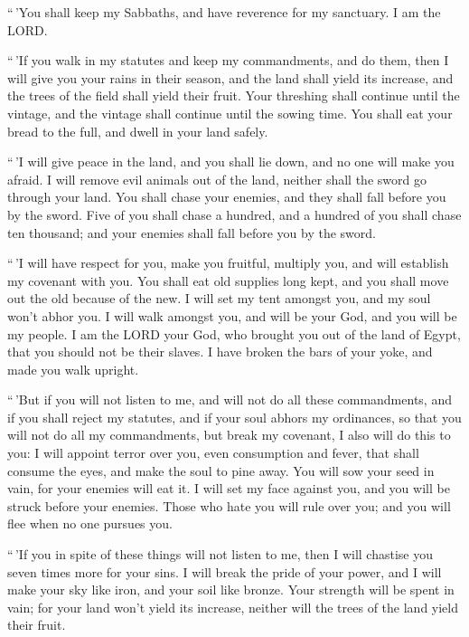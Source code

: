  ``\,'You shall keep my Sabbaths, and have reverence for my
sanctuary. I am the LORD.

 ``\,'If you walk in my statutes and keep my commandments,
and do them,  then I will give you your rains in their
season, and the land shall yield its increase, and the trees of the
field shall yield their fruit.  Your threshing shall
continue until the vintage, and the vintage shall continue until the
sowing time. You shall eat your bread to the full, and dwell in your
land safely.

 ``\,'I will give peace in the land, and you shall lie down,
and no one will make you afraid. I will remove evil animals out of the
land, neither shall the sword go through your land.  You
shall chase your enemies, and they shall fall before you by the sword.
 Five of you shall chase a hundred, and a hundred of you
shall chase ten thousand; and your enemies shall fall before you by the
sword.

 ``\,'I will have respect for you, make you fruitful,
multiply you, and will establish my covenant with you.  You
shall eat old supplies long kept, and you shall move out the old because
of the new.  I will set my tent amongst you, and my soul
won't abhor you.  I will walk amongst you, and will be your
God, and you will be my people.  I am the LORD your God,
who brought you out of the land of Egypt, that you should not be their
slaves. I have broken the bars of your yoke, and made you walk upright.

 ``\,'But if you will not listen to me, and will not do all
these commandments,  and if you shall reject my statutes,
and if your soul abhors my ordinances, so that you will not do all my
commandments, but break my covenant,  I also will do this
to you: I will appoint terror over you, even consumption and fever, that
shall consume the eyes, and make the soul to pine away. You will sow
your seed in vain, for your enemies will eat it.  I will
set my face against you, and you will be struck before your enemies.
Those who hate you will rule over you; and you will flee when no one
pursues you.

 ``\,'If you in spite of these things will not listen to
me, then I will chastise you seven times more for your sins.
 I will break the pride of your power, and I will make your
sky like iron, and your soil like bronze.  Your strength
will be spent in vain; for your land won't yield its increase, neither
will the trees of the land yield their fruit.

